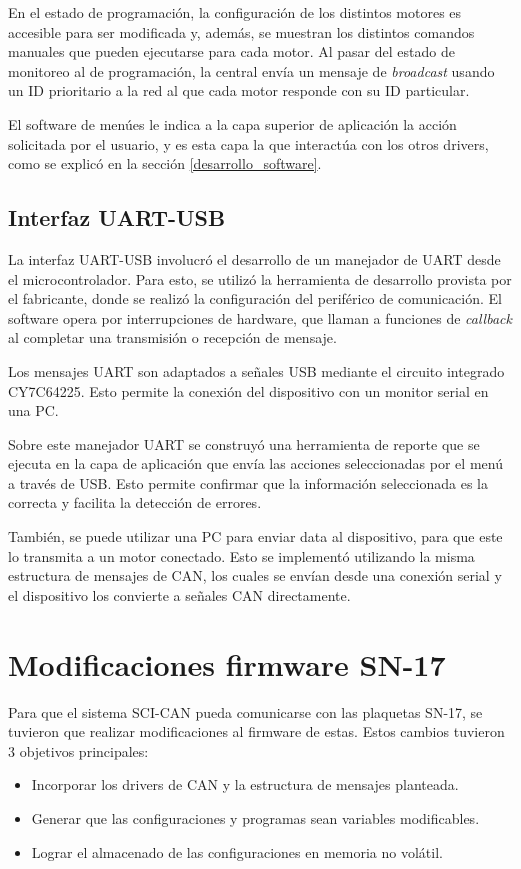 En el estado de programación, la configuración de los distintos motores es accesible para ser modificada y, además, se muestran los distintos comandos manuales que pueden ejecutarse para cada motor. Al pasar del estado de monitoreo al de programación, la central envía un mensaje de \textit{broadcast} usando un ID prioritario a la red al que cada motor responde con su ID particular.

El software de menúes le indica a la capa superior de aplicación la acción solicitada por el usuario, y es esta capa la que interactúa con los otros drivers, como se explicó en la sección \ref{desarrollo_software}.

\subsection{Interfaz UART-USB}

La interfaz UART-USB involucró el desarrollo de un manejador de UART desde el microcontrolador. Para esto, se utilizó la herramienta de desarrollo provista por el fabricante, donde se realizó la configuración del periférico de comunicación. El software opera por interrupciones de hardware, que llaman a funciones de \textit{callback} al completar una transmisión o recepción de mensaje.

Los mensajes UART son adaptados a señales USB mediante el circuito integrado CY7C64225\citep{web_interfaz_USB_UART}. Esto permite la conexión del dispositivo con un monitor serial en una PC.

Sobre este manejador UART se construyó una herramienta de reporte que se ejecuta en la capa de aplicación que envía las acciones seleccionadas por el menú a través de USB. Esto permite confirmar que la información seleccionada es la correcta y facilita la detección de errores.

También, se puede utilizar una PC para enviar data al dispositivo, para que este lo transmita a un motor conectado. Esto se implementó utilizando la misma estructura de mensajes de CAN, los cuales se envían desde una conexión serial y el dispositivo los convierte a señales CAN directamente.  

\section{Modificaciones firmware SN-17}

Para que el sistema SCI-CAN pueda comunicarse con las plaquetas SN-17, se tuvieron que realizar modificaciones al firmware de estas. Estos cambios tuvieron 3 objetivos principales:
\begin{itemize}
	\item Incorporar los drivers de CAN y la estructura de mensajes planteada.
	\item Generar que las configuraciones y programas sean variables modificables.
	\item Lograr el almacenado de las configuraciones en memoria no volátil.
\end{itemize}

